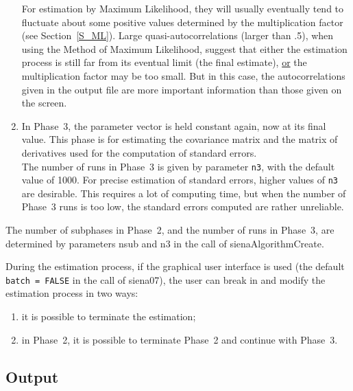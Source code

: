 \documentclass[a4paper,fleqn,11pt]{article}
\newcommand{\+}{\, + \,}
\begin{document}
\begin{enumerate}
      For estimation by Maximum Likelihood, they will usually
      eventually tend to fluctuate about some positive values
      determined by the multiplication factor (see Section~\ref{S_ML}).
      Large quasi-auto\-correlations (larger than .5), when using the Method of
      Maximum Likelihood, suggest that either the estimation process
      is still far from its eventual limit (the final estimate), \underline{or}
      the multiplication factor may be too small.
      But in this case, the auto\-correlations given in the output file
      are more important information than those given on the screen.
\item In Phase~3, the parameter vector is held constant again,
      now at its final value.
      This phase is for estimating the covariance matrix and the
      matrix of derivatives used for the computation of standard errors.\\
      The number of runs in Phase~3 is given by parameter \texttt{n3},
      with the default value of 1000.
      For precise estimation of standard errors, higher values of \texttt{n3}
      are desirable. This requires a lot
      of computing time, but when the number of Phase~3 runs is too low,
      the standard errors computed are rather unreliable.
\end{enumerate}

The number of subphases in Phase~2, and the number of runs in
Phase~3, are determined by parameters \textsf{nsub} and \textsf{n3}
in the call of \textsf{sienaAlgorithmCreate}.

During the estimation process, if the graphical user interface
is used (the default \\
\texttt{batch = FALSE} in the call of \textsf{siena07}),
the user can break in and modify the estimation process in two
ways:
\begin{enumerate}
\item it is possible to terminate the estimation;
\item in Phase~2, it is possible to terminate Phase~2
      and continue with Phase~3.
\end{enumerate}



\subsection{Output}
\label{S_output}
\end{document}
